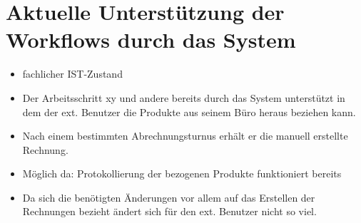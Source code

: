 
\section{Aktuelle Unterstützung der Workflows durch das System}
\begin{itemize}
	\item fachlicher IST-Zustand
	\item Der Arbeitsschritt xy und andere bereits durch das System unterstützt in dem der ext. Benutzer die Produkte aus seinem Büro heraus beziehen kann.
	\item Nach einem bestimmten Abrechnungsturnus erhält er die manuell erstellte Rechnung.
	\item Möglich da: Protokollierung der bezogenen Produkte funktioniert bereits
	\item Da sich die benötigten Änderungen vor allem auf das Erstellen der Rechnungen bezieht ändert sich für den ext. Benutzer nicht so viel.
\end{itemize}









